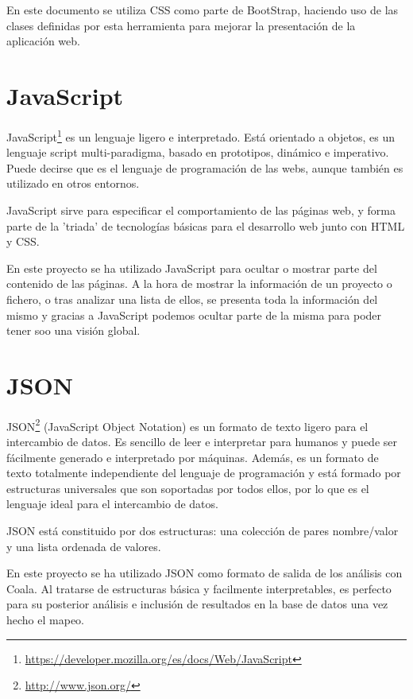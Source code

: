 \documentclass[a4paper, 12pt]{book}
\begin{document}
En este documento se utiliza CSS como parte de BootStrap, haciendo uso de las clases definidas por esta herramienta para mejorar la presentación de la aplicación web.

\section{JavaScript} 
\label{sec:seccion9}
JavaScript\footnote{\url{https://developer.mozilla.org/es/docs/Web/JavaScript}} es un lenguaje ligero e interpretado. Está orientado a objetos, es un lenguaje script multi-paradigma, basado en prototipos, dinámico e imperativo. Puede decirse que es el lenguaje de programación de las webs, aunque también es utilizado en otros entornos.

JavaScript sirve para especificar el comportamiento de las páginas web, y forma parte de la 'triada' de tecnologías básicas para el desarrollo web junto con HTML y CSS.~\cite{flanagan:_js}

En este proyecto se ha utilizado JavaScript para ocultar o mostrar parte del contenido de las páginas. A la hora de mostrar la información de un proyecto o fichero, o tras analizar una lista de ellos, se presenta toda la información del mismo y gracias a JavaScript podemos ocultar parte de la misma para poder tener soo una visión global.

\section{JSON} 
\label{sec:seccion10}
JSON\footnote{\url{http://www.json.org/}} (JavaScript Object Notation) es un formato de texto ligero para el intercambio de datos. Es sencillo de leer e interpretar para humanos y puede ser fácilmente generado e interpretado por máquinas. Además, es un formato de texto totalmente independiente del lenguaje de programación y está formado por estructuras universales que son soportadas por todos ellos, por lo que es el lenguaje ideal para el intercambio de datos.

JSON está constituido por dos estructuras: una colección de pares nombre/valor y una lista ordenada de valores.

En este proyecto se ha utilizado JSON como formato de salida de los análisis con Coala. Al tratarse de estructuras básica y facilmente interpretables, es perfecto para su posterior análisis e inclusión de resultados en la base de datos una vez hecho el mapeo.

\end{document}
